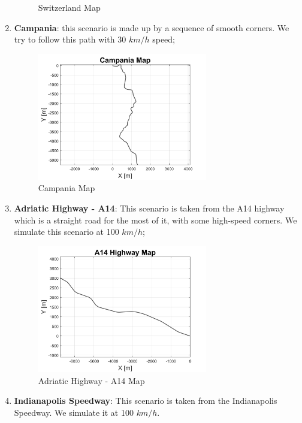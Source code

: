 \begin{enumerate}
\begin{figure}[H]
    \caption{Switzerland Map}
      \label{fig:SwitzerlandMap}
\end{figure}
\vspace{1cm}
    \item \textbf{Campania}: this scenario is made up by a sequence of smooth corners. We try to follow this path with 30 $km/h$ speed;
     \begin{figure}[H]
    \centering
    \includegraphics[width=0.7\textwidth]{Figures/CampaniaMap.png}
    \caption{Campania Map}
      \label{fig:Campania}
\end{figure}
\pagebreak
    \item \textbf{Adriatic Highway - A14}: This scenario is taken from the A14 highway which is a straight road for the most of it, with some high-speed corners. We simulate this scenario at 100 $km/h$;
     \begin{figure}[H]
    \centering
    \includegraphics[width=0.7\textwidth]{Figures/A14Map.png}
    \caption{Adriatic Highway - A14 Map}
      \label{fig:A14Map}
\end{figure}
\vspace{1cm}
    \item \textbf{Indianapolis Speedway}: This scenario is taken from the Indianapolis Speedway. We simulate it at 100 $km/h$.

\end{enumerate}
